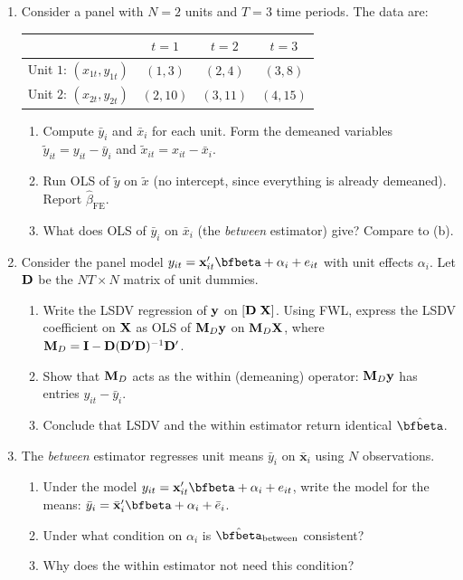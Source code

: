 \documentclass{article}
\begin{document}
\begin{enumerate}[label=\textbf{A.\arabic*},leftmargin=*,itemsep=10pt]

\item  Consider a panel with $N = 2$ units and $T = 3$ time periods.  The data are:
\begin{center}
\begin{tabular}{c|ccc}
 & $t=1$ & $t=2$ & $t=3$ \\
\hline
Unit $1$: $(x_{1t}, y_{1t})$ & $(1, 3)$ & $(2, 4)$ & $(3, 8)$ \\
Unit $2$: $(x_{2t}, y_{2t})$ & $(2, 10)$ & $(3, 11)$ & $(4, 15)$
\end{tabular}
\end{center}
\begin{enumerate}[label=(\alph*)]
  \item Compute $\bar y_i$ and $\bar x_i$ for each unit.  Form the demeaned variables $\tilde y_{it} = y_{it} - \bar y_i$ and $\tilde x_{it} = x_{it} - \bar x_i$.
  \item Run OLS of $\tilde y$ on $\tilde x$ (no intercept, since everything is already demeaned).  Report $\hat\beta_{\text{FE}}$.
  \item What does OLS of $\bar y_i$ on $\bar x_i$ (the \emph{between} estimator) give?  Compare to (b).
\end{enumerate}

\item  Consider the panel model $y_{it} = \bm x_{it}'\bfbeta + \alpha_i + e_{it}$ with unit effects $\alpha_i$.  Let ${\mathbf D}$ be the $NT\times N$ matrix of unit dummies.
\begin{enumerate}[label=(\alph*)]
  \item Write the LSDV regression of ${\mathbf y}$ on $[{\mathbf D} \; {\mathbf X}]$.  Using FWL, express the LSDV coefficient on ${\mathbf X}$ as OLS of ${\mathbf M}_D{\mathbf y}$ on ${\mathbf M}_D{\mathbf X}$, where ${\mathbf M}_D = {\mathbf I} - {\mathbf D}({\mathbf D}'{\mathbf D})^{-1}{\mathbf D}'$.
  \item Show that ${\mathbf M}_D$ acts as the within (demeaning) operator: ${\mathbf M}_D{\mathbf y}$ has entries $y_{it} - \bar y_i$.
  \item Conclude that LSDV and the within estimator return identical $\hat\bfbeta$.
\end{enumerate}

\item  The \emph{between} estimator regresses unit means $\bar y_i$ on $\bar{\bm x}_i$ using $N$ observations.
\begin{enumerate}[label=(\alph*)]
  \item Under the model $y_{it} = \bm x_{it}'\bfbeta + \alpha_i + e_{it}$, write the model for the means: $\bar y_i = \bar{\bm x}_i'\bfbeta + \alpha_i + \bar e_i$.
  \item Under what condition on $\alpha_i$ is $\hat\bfbeta_{\text{between}}$ consistent?
  \item Why does the within estimator not need this condition?
\end{enumerate}


\end{enumerate}
\end{document}
